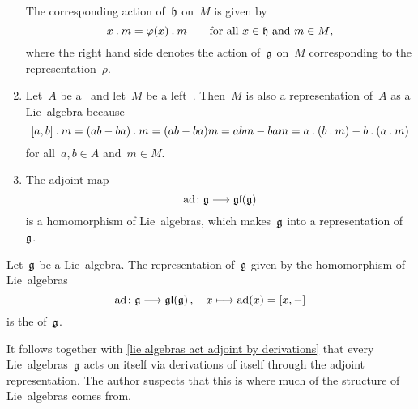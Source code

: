 \begin{examples}
\begin{enumerate}
			The corresponding action of~$\mathfrak{h}$ on~$M$ is given by
			\[
				x \mathbin{.} m = \varphi(x) \mathbin{.} m
				\qquad
				\text{for all~$x \in \mathfrak{h}$ and~$m \in M$,}
			\]
			where the right hand side denotes the action of~$\mathfrak{g}$ on~$M$ corresponding to the representation~$\rho$.
		\item
			Let~$A$ be a~\algebra{$\kf$} and let~$M$ be a left~.
			Then~$M$ is also a representation of~$A$ as a Lie~algebra because
			\[
				[a,b] \mathbin{.} m
				=
				(ab - ba) \mathbin{.} m
				=
				(ab - ba)m
				=
				abm - bam
				=
				a \mathbin{.} (b \mathbin{.} m) - b \mathbin{.} (a \mathbin{.} m)
			\]
			for all~$a, b \in A$ and~$m \in M$.
		\item
			The adjoint map
			\[
				\ad \colon \glie \to \gllie(\glie)
			\]
			is a homomorphism of Lie~algebras, which makes~$\mathfrak{g}$ into a representation of~$\mathfrak{g}$.
	\end{enumerate}
\end{examples}


\begin{definition}
	Let~$\mathfrak{g}$ be a Lie~algebra.
	The representation of~$\mathfrak{g}$ given by the homomorphism of Lie~algebras
	\[
		\ad
		\colon
		\glie
		\to
		\gllie(\glie) \,,
		\quad
		x
		\mapsto
		\ad(x)
		=
		[x,-]
	\]
	is the  of~$\mathfrak{g}$.
\end{definition}


\begin{remark}
	It follows together with \cref{lie algebras act adjoint by derivations} that every Lie~algebras~$\mathfrak{g}$ acts on itself via derivations of itself through the adjoint representation.
	The author suspects that this is where much of the structure of Lie~algebras comes from.
\end{remark}


